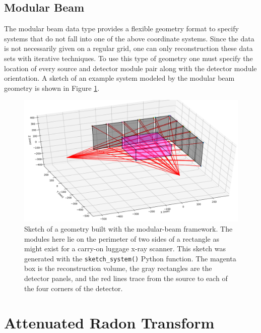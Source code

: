 \documentclass[11pt]{article}
\begin{document}
\subsection{Modular Beam}

The modular beam data type provides a flexible geometry format to specify systems that do not fall into one of the above coordinate systems.  Since the data is not necessarily given on a regular grid, one can only reconstruction these data sets with iterative techniques.  To use this type of geometry one must specify the location of every source and detector module pair along with the detector module orientation.  A sketch of an example system modeled by the modular beam geometry is shown in Figure \ref{fig:modularBeamSketch}.

\begin{figure}[h]
\begin{center}
\includegraphics[scale=0.5]{modularBeam}
\end{center}
\caption{Sketch of a geometry built with the modular-beam framework.  The modules here lie on the perimeter of two sides of a rectangle as might exist for a carry-on luggage x-ray scanner.  This sketch was generated with the \texttt{sketch\_system()} Python function.  The  magenta box is the reconstruction volume, the gray rectangles are the detector panels, and the red lines trace from the source to each of the four corners of the detector.} \label{fig:modularBeamSketch}
\end{figure}

\section{Attenuated Radon Transform} \label{sec:ART}
\end{document}
